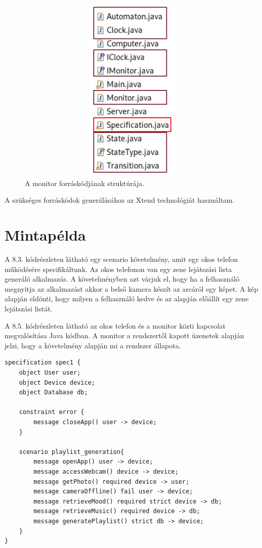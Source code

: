 \begin{figure}[!ht]
    \centering
    \includegraphics[width=150mm, height= 9cm, keepaspectratio]{figures/monitor_structure.png}
    \caption{A monitor forráskódjának struktúrája.}
\end{figure}

A szükséges forráskódok generálásához az Xtend technológiát használtam.

\clearpage\section{Mintapélda}

A 8.3. kódrészleten látható egy scenario követelmény, amit egy okos telefon működésére specifikáltunk.
Az okos telefonon van egy zene lejátszási lista generáló alkalmazás.
A követelményben azt várjuk el, hogy ha a felhasználó megnyitja az alkalmazást akkor a belső kamera készít az arcáról egy képet.
A kép alapján eldönti, hogy milyen a felhasználó kedve és az alapján előállít egy zene lejátszási listát.

A 8.5. kódrészleten látható az okos telefon és a monitor közti kapcsolat megvalósítása Java kódban.
A monitor a rendszertől kapott üzenetek alapján jelzi, hogy a követelmény alapján mi a rendszer állapota.

\begin{lstlisting}[frame=single, float=ht!, caption={Okos telefon működésére megadott scenario követelmény.},captionpos=b]
specification spec1 {
	object User user;
	object Device device;
	object Database db;

	constraint error {
		message closeApp() user -> device;
	}

	scenario playlist_generation{
		message openApp() user -> device;
		message accessWebcam() device -> device;
		message getPhoto() required device -> user;
		message cameraOffline() fail user -> device;
		message retrieveMood() required strict device -> db;
		message retrieveMusic() required device -> db;
		message generatePlaylist() strict db -> device;
	}
}
\end{lstlisting}

